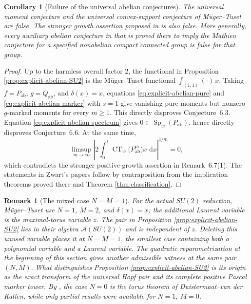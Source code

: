 \documentclass[11pt]{article}
\numberwithin{equation}{section}
\newtheorem{corollary}[theorem]{Corollary}
\newtheorem{remark}[theorem]{Remark}
\newcommand{\CT}{\operatorname{CT}}
\newcommand{\dd}{\,\mathrm d}
\begin{document}
\begin{corollary}[Failure of the universal abelian conjectures]
\label{cor:abelian-reductions}
The universal moment conjecture and the universal convex-support conjecture of
M\"uger--Tuset \cite[Conjectures~6.3 and~6.6]{MugerTuset2025} are false.  The
stronger growth assertion proposed in
\cite[Remark~6.7(1)]{MugerTuset2025} is also false.  More generally, every
auxiliary abelian conjecture in
\cite{Zwart2023,Zwart2024,Zwart2025} that is proved there to imply the Mathieu
conjecture for a specified nonabelian compact connected group is false for
that group.
\end{corollary}

\begin{proof}
Up to the harmless overall factor $2$, the functional in Proposition
\ref{prop:explicit-abelian-SU2} is the M\"uger--Tuset functional
$\int_{(1,1)}(\cdot)\,x$.  Taking
$f=P_{\mathrm{ab}}$, $g=Q_{\mathrm{ab}}$, and $\delta(x)=x$, equations
\eqref{eq:explicit-abelian-pure} and
\eqref{eq:explicit-abelian-marker} with $s=1$ give vanishing pure moments but
nonzero $g$-marked moments for every $m\geq1$.  This directly disproves
Conjecture~6.3.  Equation \eqref{eq:explicit-abelian-spectrum} gives
$0\in\operatorname{Sp}_w(P_{\mathrm{ab}})$, hence directly disproves
Conjecture~6.6.  At the same time,
\[
 \limsup_{m\to\infty}
 \left|2\int_0^1\CT_w\!\bigl(P_{\mathrm{ab}}^m\bigr)x\,\dd x\right|^{1/m}
 =0,
\]
which contradicts the stronger positive-growth assertion in Remark~6.7(1).
The statements in Zwart's papers follow by contraposition from the implication
theorems proved there and Theorem \ref{thm:classification}.
\end{proof}

\begin{remark}[The mixed case $N=M=1$]
For the actual $SU(2)$ reduction, M\"uger--Tuset use $N=1$, $M=2$, and
$\delta(x)=x$; the additional Laurent variable is the maximal-torus variable
$z$.  The pair in Proposition \ref{prop:explicit-abelian-SU2} lies in their
algebra $\mathcal A(SU(2))$ and is independent of $z$.  Deleting this unused
variable places it at $N=M=1$, the smallest case containing both a polynomial
variable and a Laurent variable.  The quadratic reparametrization at the
beginning of this section gives another admissible witness at the same pair
$(N,M)$.  What distinguishes Proposition \ref{prop:explicit-abelian-SU2} is
its origin as the exact transform of the universal Hopf pair and its complete
positive Pascal marker tower.  By \cite[Remark~6.4]{MugerTuset2025}, the case
$N=0$ is the torus theorem of Duistermaat--van der Kallen, while only partial
results were available for $N=1$, $M=0$.
\end{remark}
\end{document}
